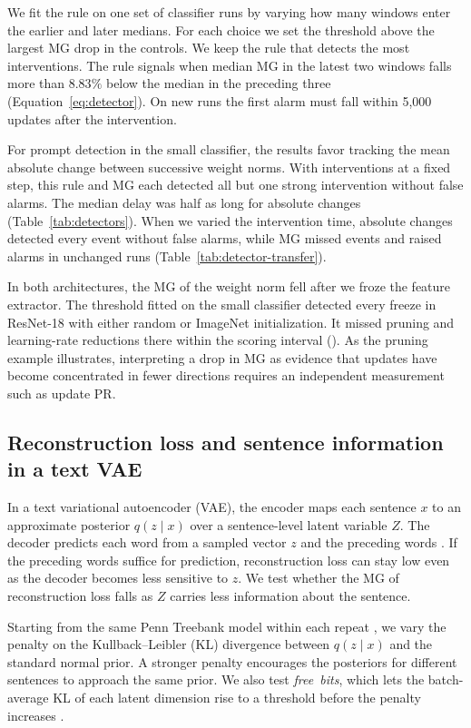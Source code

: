 {We fit the rule on one set of classifier runs by varying how many windows enter the earlier and later medians. For each choice we set the threshold above the largest MG drop in the controls. We keep the rule that detects the most interventions. The rule signals when median MG in the latest two windows falls more than $8.83\%$ below the median in the preceding three (Equation~\ref{eq:detector}). On new runs the first alarm must fall within 5,000 updates after the intervention.

For prompt detection in the small classifier, the results favor tracking the mean absolute change between successive weight norms. With interventions at a fixed step, this rule and MG each detected all but one strong intervention without false alarms. The median delay was half as long for absolute changes (Table~\ref{tab:detectors}). When we varied the intervention time, absolute changes detected every event without false alarms, while MG missed events and raised alarms in unchanged runs (Table~\ref{tab:detector-transfer}).

In both architectures, the MG of the weight norm fell after we froze the feature extractor. The threshold fitted on the small classifier detected every freeze in ResNet-18 with either random or ImageNet initialization. It missed pruning and learning-rate reductions there within the scoring interval (). As the pruning example illustrates, interpreting a drop in MG as evidence that updates have become concentrated in fewer directions requires an independent measurement such as update PR.

\subsection[Reconstruction loss and sentence information in a text VAE]{Reconstruction loss and sentence information in a text VAE}\label{sec:vae}
In a text variational autoencoder (VAE), the encoder maps each sentence $x$ to an approximate posterior $q(z\mid x)$ over a sentence-level latent variable $Z$. The decoder predicts each word from a sampled vector $z$ and the preceding words \citep{bowman2016generating}. If the preceding words suffice for prediction, reconstruction loss can stay low even as the decoder becomes less sensitive to $z$. We test whether the MG of reconstruction loss falls as $Z$ carries less information about the sentence.

Starting from the same Penn Treebank model within each repeat \citep{marcus1993building}, we vary the penalty on the Kullback--Leibler (KL) divergence between $q(z\mid x)$ and the standard normal prior. A stronger penalty encourages the posteriors for different sentences to approach the same prior. We also test \emph{free~bits}, which lets the batch-average KL of each latent dimension rise to a threshold before the penalty increases \citep{kingma2016improved}.

}

